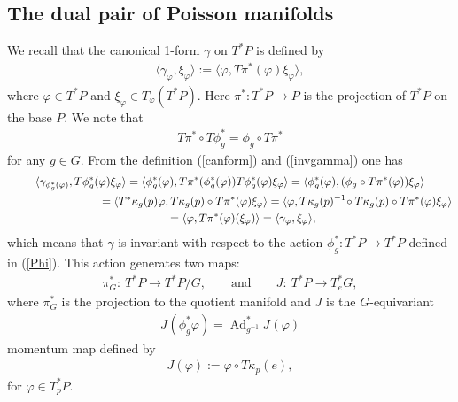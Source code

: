 \documentclass[pdftex]{sigma}
\renewcommand{\to}{\rightarrow}
\DeclareMathOperator{\Ad}{Ad}
\numberwithin{equation}{section}
\begin{document}
\subsection{The dual pair of Poisson manifolds}
We recall that the canonical 1-form $\gamma$ on $T^*P$ is def\/ined by
\begin{gather}\label{canform}
\langle \gamma_\varphi,\xi_\varphi\rangle:=
\langle \varphi,T\pi^*(\varphi)\xi_\varphi\rangle,
\end{gather}
where $\varphi\in T^*P$ and $\xi_\varphi\in T_\varphi(T^*P)$. Here $\pi^*\colon T^*P\to P$ is the projection
of $T^*P$ on the base $P$. We note that
\begin{gather}\label{invgamma} T\pi^*\circ T\phi _g^*=\phi_g\circ T\pi^*\end{gather}
for any $g\in G$. From the def\/inition (\ref{canform}) and (\ref{invgamma}) one has
\begin{gather*}
\langle\gamma _{\phi^*_g(\varphi)},T\phi^*_g(\varphi)\xi_{\varphi}\rangle=
\langle{\phi^*_g(\varphi)},T\pi^*(\phi^*_g(\varphi))T\phi^*_g(\varphi)\xi_{\varphi}\rangle
= \langle{\phi^*_g(\varphi)},(\phi_g\circ T\pi^*(\varphi))\xi_{\varphi}\rangle\\
\hphantom{\langle\gamma _{\phi^*_g(\varphi)},T\phi^*_g(\varphi)\xi_{\varphi}\rangle}{} = \langle T^*\kappa_g(p)\varphi, T\kappa_g(p)\circ T\pi^*(\varphi)\xi_\varphi\rangle
= \langle\varphi,T\kappa_g(p)^{-1}\!\circ T\kappa_g(p)\circ T\pi^*(\varphi)\xi_\varphi\rangle\\
\hphantom{\langle\gamma _{\phi^*_g(\varphi)},T\phi^*_g(\varphi)\xi_{\varphi}\rangle}{} =\langle\varphi,T\pi^*(\varphi)(\xi_{\varphi})\rangle
=\langle \gamma_{\varphi}, \xi_{\varphi}\rangle,\hfil
\end{gather*}
which means that $\gamma$ is invariant with respect to the action $\phi^*_g\colon T^*P\to T^* P$ def\/ined in (\ref{Phi}). This action generates two maps:
\begin{gather*}
\pi_G^*\colon \ T^*P\to T^*P/G, \qquad\text{and}\qquad J\colon \ T^*P\to T^*_e G,
\end{gather*}
where $\pi_G^*$ is the projection to the quotient manifold and $J$ is the $G$-equivariant
\begin{gather*} \label{xx3} J_{}(\phi_g^*\varphi)=\Ad^*_{g^{-1}}J_{}(\varphi)\end{gather*}
momentum map def\/ined by
\begin{gather}\label{momentum} J(\varphi):=\varphi\circ T\kappa_p(e),
\end{gather}
for $\varphi\in T^*_pP$.
\end{document}

